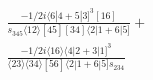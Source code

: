 \documentclass[varwidth, border=5pt]{standalone}
\begin{document}
\begin{my}
$\begin{gathered}
\scriptscriptstyle\frac{-1/2i\langle6|4+5|3]^3[16]}{s_{345}\langle12\rangle[45][34]\langle2|1+6|5]}+\\
\scriptscriptstyle\frac{-1/2i\langle16\rangle\langle4|2+3|1]^3}{\langle23\rangle\langle34\rangle[56]\langle2|1+6|5]s_{234}}\phantom{+}
\end{gathered}$
\end{my}
\end{document}
